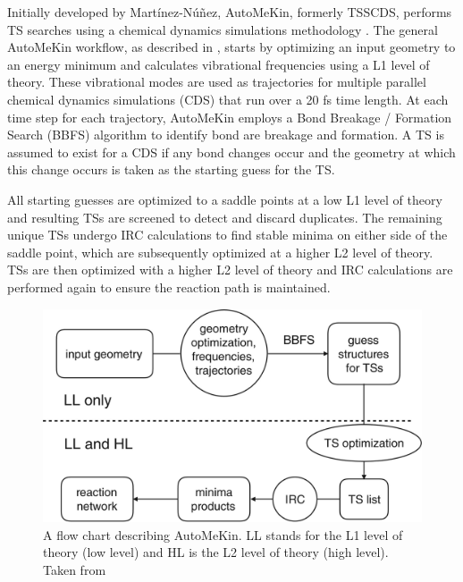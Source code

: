 \documentclass[preprint, 11pt]{elsarticle} %
\begin{document}
Initially developed by Mart\'{i}nez-N\'{u}\~{n}ez, AutoMeKin, formerly TSSCDS, performs TS searches using a chemical dynamics simulations methodology \cite{Martinez:2015,Martinez:2015jccp,rodriguez:2018,mopac:2016}.
The general AutoMeKin workflow, as described in , starts by optimizing an input geometry to an energy minimum and calculates vibrational frequencies using a L1 level of theory.
These vibrational modes are used as trajectories for multiple parallel chemical dynamics simulations (CDS) that run over a 20 fs time length.
At each time step for each trajectory, AutoMeKin employs a Bond Breakage / Formation Search (BBFS) algorithm \cite{Kopec:2019} to identify bond are breakage and formation.
A TS is assumed to exist for a CDS if any bond changes occur and the geometry at which this change occurs is taken as the starting guess for the TS.

All starting guesses are optimized to a saddle points at a low L1 level of theory and resulting TSs are screened to detect and discard duplicates.
The remaining unique TSs undergo IRC calculations to find stable minima on either side of the saddle point, which are subsequently optimized at a higher L2 level of theory. 
TSs are then optimized with a higher L2 level of theory and IRC calculations are performed again to ensure the reaction path is maintained.

\begin{figure}[htbp]
    \centering
    \includegraphics[width=5in]{tsscds}
    \caption{A flow chart describing AutoMeKin. LL stands for the L1 level of theory (low level) and HL is the L2 level of theory (high level). Taken from \cite{Kopec:2019}}
    \label{fig:tsscds}
\end{figure}
\end{document}
